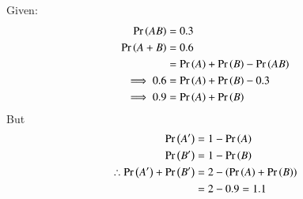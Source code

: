 Given:
\begin{align}
    \Pr\left(AB\right) &= 0.3\\
    \Pr\left(A + B\right) &= 0.6\\
    &=  \Pr\left(A\right) + \Pr\left(B\right) - \Pr\left(AB\right)\\
    \implies 0.6 &= \Pr\left(A\right) + \Pr\left(B\right) - 0.3\\
    \implies 0.9 &= \Pr\left(A\right) + \Pr\left(B\right)
\end{align}
But
\begin{align}
    \Pr\left(A^\prime\right) &= 1 - \Pr\left(A\right)\\
    \Pr\left(B^\prime\right) &= 1 - \Pr\left(B\right)\\
    \therefore \Pr\left(A^\prime\right) + \Pr\left(B^\prime\right) &= 2 - \left(\Pr\left(A\right) + \Pr\left(B\right)\right)\\
    &= 2 - 0.9
    = 1.1
\end{align}

